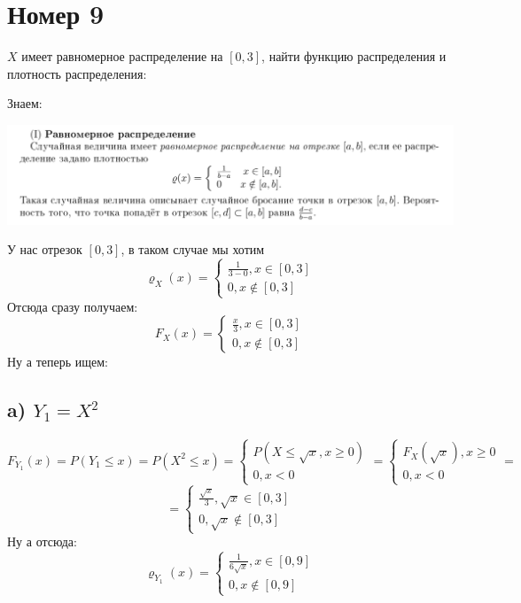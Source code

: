 \documentclass[a4paper,12pt]{article}
\begin{document}
\section*{Номер 9}
$X$ имеет равномерное распределение на $[0, 3]$, найти функцию распределения и плотность распределения:

Знаем:
\begin{center}
\includegraphics[scale=0.4]{1.png}
\end{center}
У нас отрезок $[0, 3]$, в таком случае мы хотим
\[
\varrho_X(x) = \begin{cases}
\frac{1}{3 - 0} , x \in [0, 3] \\
0, x \notin [0, 3]
\end{cases}
\]
Отсюда сразу получаем:
\[
F_X(x) = \begin{cases}
\frac{x}{3} , x \in [0, 3] \\
0, x \notin [0, 3]
\end{cases}
\]
Ну а теперь ищем:
\subsection*{a) $Y_1 = X^2$}
\[
F_{Y_1}(x) = P(Y_1 \leq x) = P(X^2 \leq x) = \begin{cases}
P(X \leq \sqrt{x}, x \geq 0) \\
0, x < 0
\end{cases} = \begin{cases}
F_X(\sqrt{x}), x \geq 0 \\
0, x < 0
\end{cases} = 
\]
\[
=
\begin{cases}
\frac{\sqrt{x}}{3}, \sqrt{x} \in [0, 3] \\
0, \sqrt{x} \notin [0, 3]
\end{cases}
\]
Ну а отсюда:
\[
\varrho_{Y_1}(x) = \begin{cases}
\frac{1}{6\sqrt{x}}, x \in [0, 9] \\
0, x \notin [0, 9]
\end{cases}
\]
\end{document}
